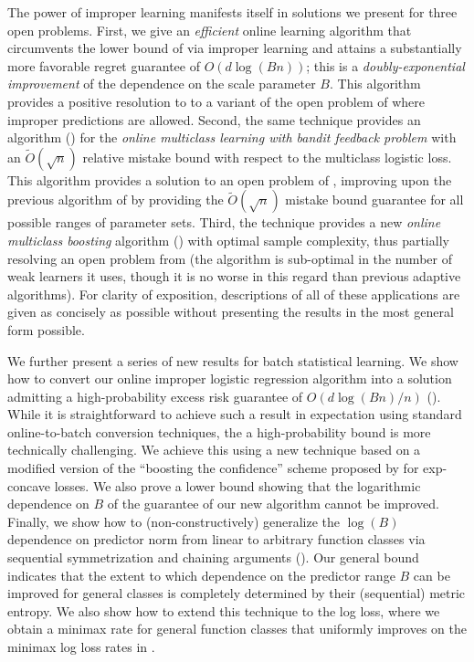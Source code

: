 The power of improper learning manifests itself in solutions we present for three open problems. First, we give an \emph{efficient} online learning algorithm that circumvents the lower bound of \citet{hazan2014logistic} via improper learning and attains a substantially more favorable regret guarantee of $O(d\log(Bn))$; this is a \emph{doubly-exponential improvement} of the dependence on the scale parameter $B$. This algorithm provides a positive resolution to to a variant of the open problem of \citet{mcmahan2012open} where improper predictions are allowed. Second, the same technique provides an algorithm () for the \emph{online multiclass learning with bandit feedback problem} \citep{kakade2008efficient} with an $\tilde{O}(\sqrt{n})$ relative mistake bound with respect to the multiclass logistic loss. This algorithm provides a solution to an open problem of \citet{abernethyR09a}, improving upon the previous algorithm of \citet{hazan2011newtron} by providing the $\tilde{O}(\sqrt{n})$ mistake bound guarantee for all possible ranges of parameter sets. Third, the technique provides a new \emph{online multiclass boosting} algorithm () with optimal sample complexity, thus partially resolving an open problem from \citep{beygelzimer2015optimal,jung2017onlinemulticlass} (the algorithm is sub-optimal in the number of weak learners it uses, though it is no worse in this regard than previous adaptive algorithms). For clarity of exposition, descriptions of all of these applications are given as concisely as possible without presenting the results in the most general form possible.

We further present a series of new results for batch statistical
learning. We show how to convert our online improper logistic
regression algorithm into a solution admitting a high-probability
excess risk guarantee of $O(d\log(Bn)/n)$
(). While it is straightforward to achieve such a result in expectation using standard
online-to-batch conversion techniques, the a high-probability bound is more technically challenging. We achieve this using a new technique based on a
modified version of the ``boosting the confidence'' scheme proposed by
\citet{mehta2016fast} for exp-concave losses.  We also prove a lower bound showing that the logarithmic dependence on $B$ of the guarantee of our new algorithm cannot be improved.  Finally, we show how to (non-constructively)
generalize the $\log(B)$ dependence on predictor norm from linear to arbitrary function classes via sequential symmetrization and chaining arguments
(). Our general bound indicates that the
extent to which dependence on the predictor range $B$ can be improved for general classes is completely determined by their (sequential) metric entropy. We also show how to extend this technique to the log loss, where we obtain a minimax rate for general function classes that uniformly improves on the minimax log loss rates in \cite{RakSri15}.


